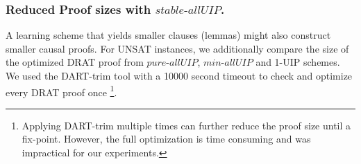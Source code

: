 \documentclass[runningheads]{llncs}
\newcommand{\allUip}{\textit{stable-allUIP}}
\newcommand{\allUipPure}{\textit{pure-allUIP}\xspace}
\newcommand{\allUipMin}{\textit{min-allUIP}\xspace}
\newcommand{\MapleIUIPPure}{\text{Maple-\allUipPure}}
\newcommand{\MapleIUIMin}{\text{Maple-\allUipMin}}
\newcommand{\nf}[1]{{\color{red}{#1}}}
\begin{document}



\subsubsection{Reduced Proof sizes with $\allUip$.}
A learning scheme that yields smaller clauses (lemmas) might also
construct smaller causal proofs. For UNSAT instances, we additionally
compare the size of the optimized DRAT proof from $\allUipPure$,
$\allUipMin$ and 1-UIP schemes. We used the DART-trim tool
\cite{wetzler2014drat} with a 10000 second timeout to check and
optimize every DRAT proof once \footnote{Applying DART-trim multiple
  times can further reduce the proof size until a fix-point. However,
  the full optimization is time consuming and was impractical for our
  experiments.}.
\end{document}

